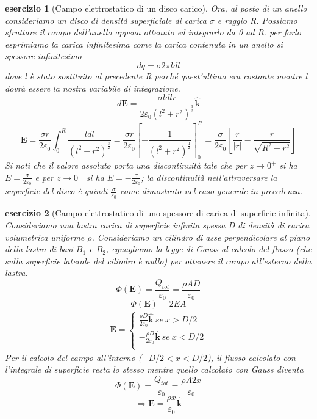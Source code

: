 \documentclass[10pt,a4paper]{article}
\newtheorem{esercizio}{esercizio}
\begin{document}
\begin{esercizio}[Campo elettrostatico di un disco carico]
Ora, al posto di un anello consideriamo un disco di densità superficiale di carica $\sigma$ e raggio R. Possiamo sfruttare il campo dell'anello appena ottenuto ed integrarlo da 0 ad R. per farlo esprimiamo la carica infinitesima come la carica contenuta in un anello si spessore infinitesimo
\[dq = \sigma 2\pi l dl\]
dove l è stato sostituito al precedente R perché quest'ultimo era costante mentre l dovrà essere la nostra variabile di integrazione. 
\[d\mathbf{E} = \frac{  \sigma l dl r }{2\varepsilon_0 (l^2+r^2)^{\frac{3}{2}}}\hat{\mathbf{k}}\]
\[\mathbf{E} = \frac{\sigma r}{2\varepsilon_0}\int_{0}^{R}\frac{ldl}{(l^2+r^2)^{\frac{3}{2}}} = \frac{\sigma r}{2\varepsilon_0}\left[-\frac{1}{(l^2+r^2)^{\frac{1}{2}}}\right]^R_0 = \frac{\sigma }{2\varepsilon_0}\left[\frac{r}{|r|}-\frac{r}{\sqrt{R^2+r^2}}\right]\]
Si noti che il valore assoluto porta una discontinuità tale che per \(z\to0^+\) si ha \(E = \frac{\sigma}{2\varepsilon_0}\) e per \(z\to0^-\) si ha \(E = -\frac{\sigma}{2\varepsilon_0}\); la discontinuità nell'attraversare la superficie del disco è quindi \(\frac{\sigma}{\varepsilon_0}\) come dimostrato nel caso generale in precedenza.
\end{esercizio}
\begin{esercizio}[Campo elettrostatico di uno spessore di carica di superficie infinita]
Consideriamo una lastra carica di superficie infinita spessa D di densità di carica volumetrica uniforme $\rho$. Consideriamo un cilindro di asse perpendicolare al piano della lastra di basi \(B_1\) e \(B_2\), eguagliamo la legge di Gauss al calcolo del flusso (che sulla superficie laterale del cilindro è nullo) per ottenere il campo all'esterno della lastra. 
\[\Phi(\mathbf{E}) = \frac{Q_{tot}}{\varepsilon_0} = \frac{\rho A D}{\varepsilon_0}\]
\[\Phi(\mathbf{E}) = 2EA\]
\begin{align*}
	\mathbf{E} =
	\begin{cases}
	\frac{\rho D}{2\varepsilon_0}\hat{\mathbf{k}}\ se\ x>D/2\\
	-\frac{\rho D}{2\varepsilon_0}\hat{\mathbf{k}}\ se\ x<D/2\\
	\end{cases}
\end{align*}
 Per il calcolo del campo all'interno (\(-D/2<x<D/2\)), il flusso calcolato con l'integrale di superficie resta lo stesso mentre quello calcolato con Gauss diventa
  \[\Phi(\mathbf{E}) = \frac{Q_{tot}}{\varepsilon_0} = \frac{\rho A 2x}{\varepsilon_0} \]
  \[\Rightarrow \mathbf{E} = \frac{\rho x}{\varepsilon_0}\hat{\mathbf{k}}\]
\end{esercizio}
\end{document}
